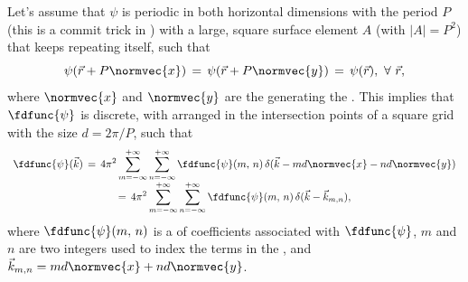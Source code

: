 Let's assume that $\psi$ is periodic in both horizontal dimensions with the period $P$ (this is a commit trick in ) with a large, square surface element $A$ (with \mbox{$|A| = P^2$}) that keeps repeating itself, such that
%
\begin{equation} \label{eq:water_surface_periodicity}
\psi(\vec{r}+P\normvec{x}) \,=\, \psi(\vec{r}+P\normvec{y}) \,=\, \psi(\vec{r}),\ \forall\ \vec{r},
\end{equation}
%
where $\normvec{x}$ and $\normvec{y}$ are the  generating the . This implies that $\fdfunc{\psi}$ is discrete, with  arranged in the intersection points of a square grid with the size $d = 2\pi/P$, such that
%
\begin{equation} \label{eq:fd_eta_series}
\renewcommand*{\arraystretch}{2}
\begin{array}{c}
\displaystyle \fdfunc{\psi}(\vec{k}) \,=\, 4\pi^2\sum_{m=-\infty}^{+\infty}\sum_{n=-\infty}^{+\infty} \fdfunc{\psi}(m,\,n)\,\delta(\vec{k} - md\normvec{x} - nd\normvec{y}) \\
\displaystyle =\, 4\pi^2\sum_{m=-\infty}^{+\infty}\sum_{n=-\infty}^{+\infty} \fdfunc{\psi}(m,\,n)\,\delta(\vec{k} - \vec{k}_{m,n}),
\end{array}
\end{equation}
%
where $\fdfunc{\psi}(m,\,n)$ is a \twodimensional \sequence of coefficients associated with $\fdfunc{\psi}$, $m$ and $n$ are two integers used to index the terms in the \series, and $\vec{k}_{m,n} = md\normvec{x} + nd\normvec{y}$.

